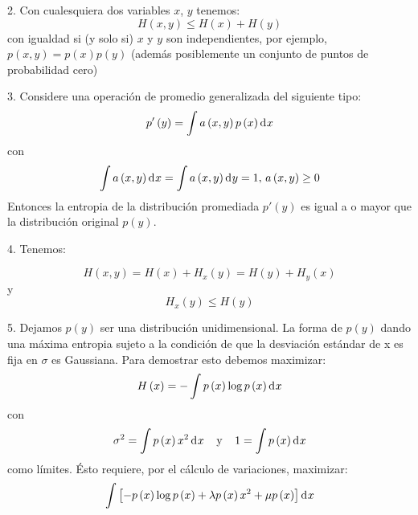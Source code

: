 2. Con cualesquiera dos variables $x$, $y$ tenemos:
\begin{equation}
H\left ( x,y \right )\leq H\left ( x \right )+H\left ( y \right )
\end{equation}
con igualdad si (y solo si) $x$ y $y$ son independientes, por ejemplo,
$p\left ( x,y \right )=p\left ( x \right )p\left ( y \right )$
(adem\'{a}s posiblemente un conjunto de puntos de probabilidad cero)

3. Considere una operaci\'{o}n de promedio generalizada del siguiente tipo:
\begin{equation}
{p}'\left ( y \right )=\int a\left ( x,y \right )p\left ( x \right ) \diff x 
\end{equation}
con
\begin{equation}
\int a\left ( x,y \right ) \diff x =\int a\left ( x,y \right ) \diff y =1, 
\,  a\left ( x,y \right )\geq 0
\end{equation}
Entonces la entropia de la distribuci\'{o}n promediada ${p}'\left ( y
\right )$ es igual a o mayor que la distribuci\'{o}n original $p\left
( y \right )$. 

4. Tenemos:

\begin{equation}
H\left ( x,y \right )=H\left ( x \right )+H_{x}\left ( y \right )=H\left ( y \right )+H_{y}\left ( x \right )
\end{equation}
y
\begin{equation}
H_x{}\left ( y \right )\leq H\left ( y \right )
\end{equation}

5. Dejamos $p\left ( y \right )$ ser una distribuci\'{o}n unidimensional. La forma de $p\left ( y \right )$ dando una m\'{a}xima entropia sujeto a la condici\'{o}n de que la desviaci\'{o}n est\'{a}ndar de x es fija en $\sigma $ es Gaussiana. Para demostrar esto debemos maximizar:
\begin{equation}
H\left ( x \right )=-\int p\left ( x \right )\log p\left ( x \right ) \diff x 
\end{equation}
con
\begin{equation}
\sigma^{2}=\int p\left ( x \right )x^{2} \diff x  \:\:\:\:\: \textup{y} \:\:\:\:\: 1=\int p\left ( x \right ) \diff x 
\end{equation}
como l\'{i}mites. \'{E}sto requiere, por el c\'{a}lculo de variaciones, maximizar:
\begin{equation}
\int \left [ -p\left ( x \right ) \log p\left ( x \right ) + \lambda p\left ( x \right ) x^{2} + \mu p\left ( x \right )\right ] \diff x 
\end{equation}


